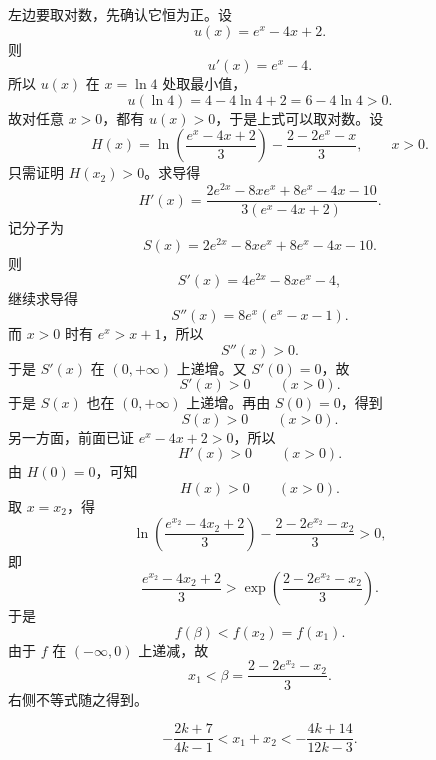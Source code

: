 \begin{solution}
左边要取对数，先确认它恒为正。设
\[
u(x)=e^x-4x+2.
\]
则
\[
u'(x)=e^x-4.
\]
所以 $u(x)$ 在 $x=\ln4$ 处取最小值，
\[
u(\ln4)=4-4\ln4+2=6-4\ln4>0.
\]
故对任意 $x>0$，都有 $u(x)>0$，于是上式可以取对数。设
\[
H(x)=\ln\left(\frac{e^x-4x+2}{3}\right)-\frac{2-2e^x-x}{3},\qquad x>0.
\]
只需证明 $H(x_2)>0$。求导得
\[
H'(x)=\frac{2e^{2x}-8xe^x+8e^x-4x-10}{3(e^x-4x+2)}.
\]
记分子为
\[
S(x)=2e^{2x}-8xe^x+8e^x-4x-10.
\]
则
\[
S'(x)=4e^{2x}-8xe^x-4,
\]
继续求导得
\[
S''(x)=8e^x(e^x-x-1).
\]
而 $x>0$ 时有 $e^x>x+1$，所以
\[
S''(x)>0.
\]
于是 $S'(x)$ 在 $(0,+\infty)$ 上递增。又 $S'(0)=0$，故
\[
S'(x)>0\qquad(x>0).
\]
于是 $S(x)$ 也在 $(0,+\infty)$ 上递增。再由 $S(0)=0$，得到
\[
S(x)>0\qquad(x>0).
\]
另一方面，前面已证 $e^x-4x+2>0$，所以
\[
H'(x)>0\qquad(x>0).
\]
由 $H(0)=0$，可知
\[
H(x)>0\qquad(x>0).
\]
取 $x=x_2$，得
\[
\ln\left(\frac{e^{x_2}-4x_2+2}{3}\right)-\frac{2-2e^{x_2}-x_2}{3}>0,
\]
即
\[
\frac{e^{x_2}-4x_2+2}{3}
>
\exp\left(\frac{2-2e^{x_2}-x_2}{3}\right).
\]
于是
\[
f(\beta)<f(x_2)=f(x_1).
\]
由于 $f$ 在 $(-\infty,0)$ 上递减，故
\[
x_1<\beta=\frac{2-2e^{x_2}-x_2}{3}.
\]
右侧不等式随之得到。


\[
-\frac{2k+7}{4k-1}<x_1+x_2<-\frac{4k+14}{12k-3}.
\]
\end{solution}



